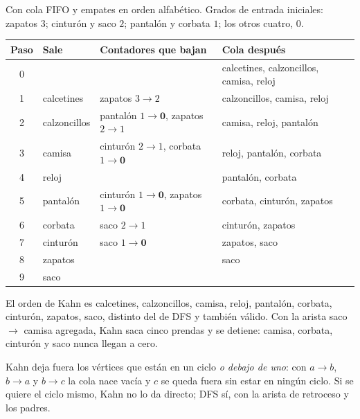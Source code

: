 \documentclass[11pt,letterpaper]{article}
\begin{document}
\begin{ejemplo}
  \label{ej:ropa-kahn}
  Con cola FIFO y empates en orden alfabético. Grados de entrada
  iniciales: zapatos $3$; cinturón y saco $2$; pantalón y corbata $1$;
  los otros cuatro, $0$.
  \begin{center}
  \small
  \begin{tabular}{clll}
    \toprule
    \textbf{Paso} & \textbf{Sale} & \textbf{Contadores que bajan}
      & \textbf{Cola después} \\
    \midrule
    0 & & & calcetines, calzoncillos, camisa, reloj \\
    1 & calcetines & zapatos $3 \to 2$ & calzoncillos, camisa,
      reloj \\
    2 & calzoncillos & pantalón $1 \to \mathbf{0}$, zapatos
      $2 \to 1$ & camisa, reloj, pantalón \\
    3 & camisa & cinturón $2 \to 1$, corbata $1 \to \mathbf{0}$
      & reloj, pantalón, corbata \\
    4 & reloj & & pantalón, corbata \\
    5 & pantalón & cinturón $1 \to \mathbf{0}$, zapatos
      $1 \to \mathbf{0}$ & corbata, cinturón, zapatos \\
    6 & corbata & saco $2 \to 1$ & cinturón, zapatos \\
    7 & cinturón & saco $1 \to \mathbf{0}$ & zapatos, saco \\
    8 & zapatos & & saco \\
    9 & saco & & \\
    \bottomrule
  \end{tabular}
  \end{center}
  El orden de Kahn es calcetines, calzoncillos, camisa, reloj,
  pantalón, corbata, cinturón, zapatos, saco, distinto del de DFS y
  también válido. Con la arista saco $\to$ camisa agregada, Kahn saca
  cinco prendas y se detiene: camisa, corbata, cinturón y saco nunca
  llegan a cero.
\end{ejemplo}

\begin{ojo}
  Kahn deja fuera los vértices que están en un ciclo \emph{o debajo de
  uno}: con $a \to b$, $b \to a$ y $b \to c$ la cola nace vacía y $c$
  se queda fuera sin estar en ningún ciclo. Si se quiere el ciclo
  mismo, Kahn no lo da directo; DFS sí, con la arista de retroceso y
  los padres.
\end{ojo}

\end{document}

